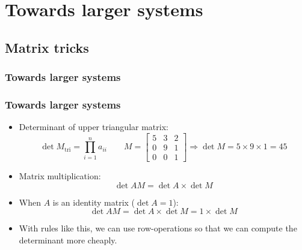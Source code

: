 \section{Towards larger systems}
\subsection*{Matrix tricks}

\begin{frame}[fragile]
  \frametitle{Towards larger systems}
\end{frame}

\begin{frame}[fragile]
  \frametitle{Towards larger systems}
  \begin{itemize}
    \item Determinant of upper triangular matrix:
    \[
    \det{M_\text{tri}} = \prod_{i=1}^n a_{ii} \qquad M=\begin{bmatrix}
5 & 3 & 2 \\ 
0 & 9 & 1 \\
0 & 0 & 1
\end{bmatrix} \Rightarrow \det{M} = 5 \times 9 \times 1 = 45
    \]
  \item Matrix multiplication:
  \[
  \det{AM}=\det{A}\times\det{M}
  \]
  \item When $A$ is an identity matrix ($\det{A}=1$):
  \[
   \det{AM}=\det{A}\times\det{M} = 1\times\det{M}
  \]
  \item With rules like this, we can use row-operations so that we can compute the determinant more cheaply.
  \end{itemize}
\end{frame}

